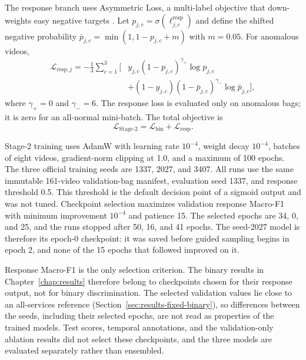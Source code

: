 The response branch uses Asymmetric Loss, a multi-label objective that down-weights easy negative targets \cite{ridnik2021asymmetric}. Let $p_{j,c}=\sigma(\ell^{\mathrm{resp}}_{j,c})$ and define the shifted negative probability $\bar{p}_{j,c}=\min(1,1-p_{j,c}+m)$ with $m=0.05$. For anomalous videos,
\begin{equation}
\begin{split}
    \mathcal{L}_{\mathrm{resp},j}
    =-\frac{1}{3}\sum_{c=1}^{3}\Big[
       &y_{j,c}(1-p_{j,c})^{\gamma_+}\log p_{j,c}\\
       &+(1-y_{j,c})(1-\bar{p}_{j,c})^{\gamma_-}
       \log\bar{p}_{j,c}\Big],
\end{split}
\end{equation}
where $\gamma_+=0$ and $\gamma_-=6$. The response loss is evaluated only on anomalous bags; it is zero for an all-normal mini-batch. The total objective is
\begin{equation}
    \mathcal{L}_{\mathrm{Stage\text{-}2}}
    =\mathcal{L}_{\mathrm{bin}}+\mathcal{L}_{\mathrm{resp}}.
\end{equation}

Stage-2 training uses AdamW with learning rate $10^{-4}$, weight decay $10^{-4}$, batches of eight videos, gradient-norm clipping at 1.0, and a maximum of 100 epochs. The three official training seeds are 1337, 2027, and 3407. All runs use the same immutable 161-video validation-bag manifest, evaluation seed 1337, and response threshold 0.5. This threshold is the default decision point of a sigmoid output and was not tuned. Checkpoint selection maximizes validation response Macro-F1 with minimum improvement $10^{-4}$ and patience 15. The selected epochs are 34, 0, and 25, and the runs stopped after 50, 16, and 41 epochs. The seed-2027 model is therefore its epoch-0 checkpoint: it was saved before guided sampling begins in epoch 2, and none of the 15 epochs that followed improved on it.

Response Macro-F1 is the only selection criterion. The binary results in Chapter~\ref{chap:results} therefore belong to checkpoints chosen for their response output, not for binary discrimination. The selected validation values lie close to an all-services reference (Section~\ref{sec:results-fixed-binary}), so differences between the seeds, including their selected epochs, are not read as properties of the trained models. Test scores, temporal annotations, and the validation-only ablation results did not select these checkpoints, and the three models are evaluated separately rather than ensembled.

